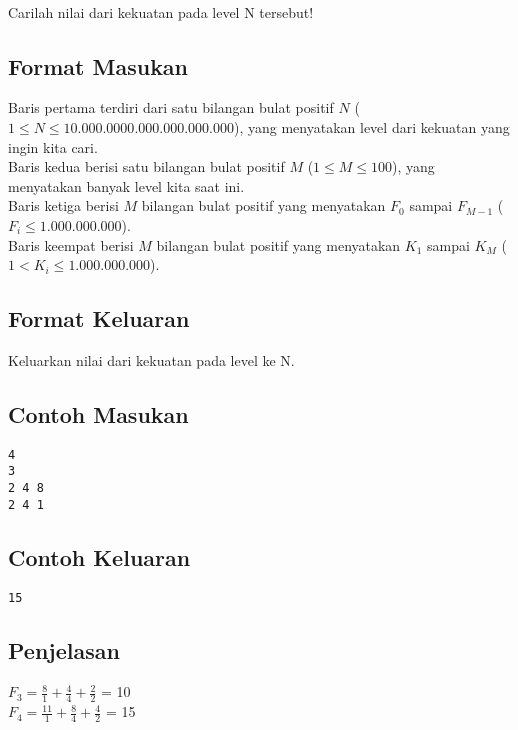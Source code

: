 \documentclass{article}
\begin{document}
\\
Carilah nilai dari kekuatan pada level N tersebut!

\subsection*{Format Masukan}

Baris pertama terdiri dari satu bilangan bulat positif $N$ ($1 \leq N \leq 10.000.0000.000.000.000.000$), yang menyatakan level dari kekuatan yang ingin kita cari.\\
Baris kedua berisi satu bilangan bulat positif $M$ ($1 \leq M \leq 100$), yang menyatakan banyak level kita saat ini.\\
Baris ketiga berisi $M$ bilangan bulat positif yang menyatakan $F_0$ sampai $F_{M-1}$ ($F_i \leq 1.000.000.000$).\\
Baris keempat berisi $M$ bilangan bulat positif yang menyatakan $K_1$ sampai $K_{M}$ ($ 1 < K_i \leq 1.000.000.000 $).\\

\subsection*{Format Keluaran}

Keluarkan nilai dari kekuatan pada level ke N.
\\

\begin{multicols}{2}
\subsection*{Contoh Masukan}
\begin{lstlisting}
4
3
2 4 8
2 4 1
\end{lstlisting}
\columnbreak
\subsection*{Contoh Keluaran}
\begin{lstlisting}
15
\end{lstlisting}
\vfill
\null
\end{multicols}

\subsection*{Penjelasan}
\(F_3   = \frac{8}{1} + \frac{4}{4} + \frac{2}{2}\) = 10\\



\(F_4   = \frac{11}{1} + \frac{8}{4} + \frac{4}{2}\) = 15

\pagebreak
\end{document}
